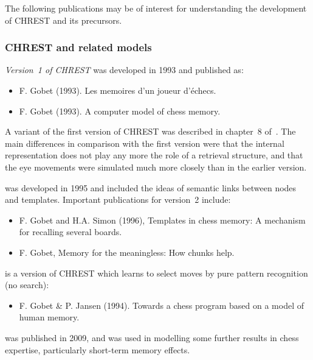 \documentclass{article}
\begin{document}
The following publications may be of interest for understanding the development 
of CHREST and its precursors.

\subsubsection{CHREST and related models}

{\em Version~1 of CHREST} was developed in 1993 and published as:

\begin{itemize}
\item F. Gobet (1993). Les memoires d'un joueur d'\'echecs.~\cite{Gobet93a}
\item F. Gobet (1993). A computer model of chess memory.~\cite{Gobet93b}
\end{itemize}

A variant of the first version of CHREST was described in chapter~8 of~\cite{deGroot96}.
The main differences in comparison with the first version were that the
internal representation does not play any more the role of a retrieval
structure, and that the eye movements were simulated much more closely than in
the earlier version. 
\vspace{3pt}

 was developed in 1995 and included the
ideas of semantic links between nodes and templates.  Important publications
for version~2 include:

\begin{itemize}
\item F. Gobet and H.A. Simon (1996), Templates in chess memory: A mechanism for 
recalling several boards.~\cite{Gobet96b}
\item F. Gobet, Memory for the meaningless: How chunks help.~\cite{Gobet98a}
\end{itemize}

 is a version of CHREST which learns to select moves by pure
pattern recognition (no search):

\begin{itemize}
\item F. Gobet \& P. Jansen (1994). Towards a chess program based on a model of
human memory.~\cite{Gobet94} 
\end{itemize}

 was published in 2009, and was used in
modelling some further results in chess expertise, particularly short-term
memory effects.
\end{document}
